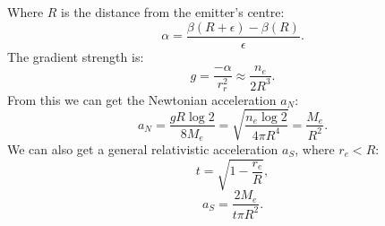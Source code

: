 \documentclass[12pt]{article}
\begin{document}
Where $R$ is the distance from the emitter's centre:
\begin{equation}
\alpha = \frac{\beta(R + \epsilon) - \beta(R)}{\epsilon}.
\end{equation}
The gradient strength is:
\begin{equation}
g = \frac{-\alpha}{r_{r}^2} \approx \frac{n_e}{2 R^3}.
\end{equation}
From this we can get the Newtonian acceleration $a_N$:
\begin{equation}
a_N =\frac{g R \log 2}{8 M_{e}} =  \sqrt{\frac{n_e \log 2}{4 \pi R^4}} = \frac{M_{e}}{R^2}.
\end{equation}
We can also get a general relativistic acceleration $a_S$, where $r_e < R$:
\begin{equation}
t = \sqrt{1 - \frac{r_e}{R}},
\end{equation}
\begin{equation}
a_S = \frac{2 M_e}{t \pi R^2}.
\end{equation}
\end{document}
